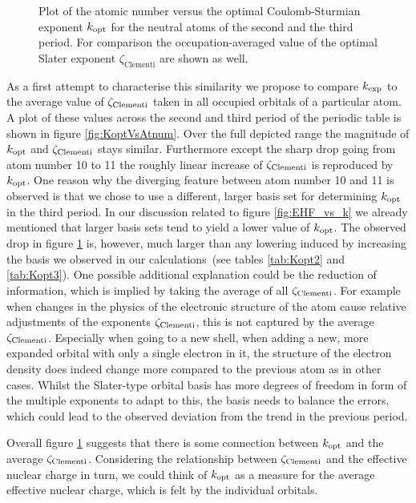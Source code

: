 \begin{figure}
	\centering
	\caption[
		Plot atomic number versus the optimal Coulomb-Sturmian exponent
	]{
		Plot of the atomic number versus the optimal Coulomb-Sturmian exponent
		$k_\text{opt}$ for the neutral atoms of the second and the third period.
		For comparison the occupation-averaged value of the \citet{Clementi1963} optimal
		Slater exponent $\zeta_\text{Clementi}$ are shown as well.
	}
	\label{fig:KoptVsAtnum}
\end{figure}
As a first attempt to characterise this similarity we propose
to compare $k_\text{exp}$ to the average value of $\zeta_\text{Clementi}$ taken
in all occupied orbitals of a particular atom.
A plot of these values
across the second and third period of the periodic
table is shown in figure \vref{fig:KoptVsAtnum}.
Over the full depicted range the magnitude of $k_\text{opt}$ and $\zeta_\text{Clementi}$ stays similar.
Furthermore except the sharp drop going from atom number 10 to 11
the roughly linear increase of $\zeta_\text{Clementi}$ is reproduced by $k_\text{opt}$.
One reason why the diverging feature between atom number 10 and 11
is observed is that we chose to use a different, larger \CS basis set
for determining $k_\text{opt}$ in the third period.
In our discussion related to figure \ref{fig:EHF_vs_k}
we already mentioned that larger basis sets tend to
yield a lower value of $k_\text{opt}$.
The observed drop in figure \ref{fig:KoptVsAtnum} is, however,
much larger than any lowering induced by increasing the basis
we observed in our calculations~(see tables \ref{tab:Kopt2} and \ref{tab:Kopt3}).
One possible additional explanation could be the reduction
of information, which is implied by taking the average of all $\zeta_\text{Clementi}$.
For example when changes in the physics of the electronic structure of the atom
cause relative adjustments of the exponents $\zeta_\text{Clementi}$,
this is not captured by the average $\zeta_\text{Clementi}$.
Especially when going to a new shell,
\ie when adding a new, more expanded orbital
with only a single electron in it,
the structure of the electron density does indeed change more
compared to the previous atom as in other cases.
Whilst the Slater-type orbital basis has more degrees of freedom
in form of the multiple exponents to adapt to this,
the \CS basis needs to balance the errors,
which could lead to the observed deviation from the trend in the previous period.

Overall figure \ref{fig:KoptVsAtnum} suggests
that there is some connection between $k_\text{opt}$ and the average $\zeta_\text{Clementi}$.
Considering the relationship between $\zeta_\text{Clementi}$ and the effective nuclear charge in turn,
we could think of $k_\text{opt}$ as a measure for the average effective nuclear charge,
which is felt by the individual orbitals.

